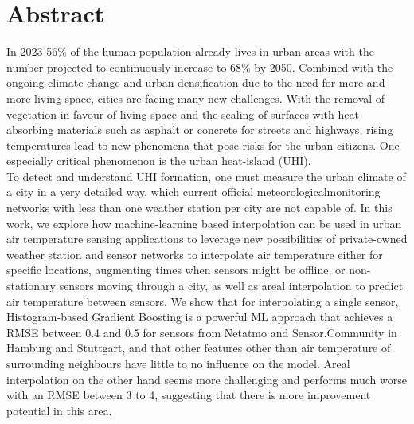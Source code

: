 \chapter*{Abstract}
In 2023 56\% of the human population already lives in urban areas with the number projected to continuously  increase to 68\% by 2050. Combined with the ongoing climate change and urban densification due to the need for more and more living space, cities are facing many new challenges. With the removal of vegetation in favour of living space and the sealing of surfaces with heat-absorbing materials such as asphalt or concrete for streets and highways, rising temperatures lead to new phenomena that pose risks for the urban citizens. One especially critical phenomenon is the urban heat-island (UHI).\\
To detect and understand UHI formation, one must measure the urban climate of a city in a very detailed way, which current official meteorologicalmonitoring networks with less than one weather station per city are not capable of. In this work, we explore how machine-learning based interpolation can be used in urban air temperature sensing applications to leverage new possibilities of private-owned weather station and sensor networks to interpolate air temperature either for specific locations, augmenting times when sensors might be offline, or non-stationary sensors moving through a city, as well as areal interpolation to predict air temperature between sensors. We show that for interpolating a single sensor, Histogram-based Gradient Boosting is a powerful ML approach that achieves a RMSE between 0.4 and 0.5 for sensors from Netatmo and Sensor.Community in Hamburg and Stuttgart, and that other features other than air temperature of surrounding neighbours have little to no influence on the model. Areal interpolation on the other hand seems more challenging and performs much worse with an RMSE between 3 to 4, suggesting that there is more improvement potential in this area.

